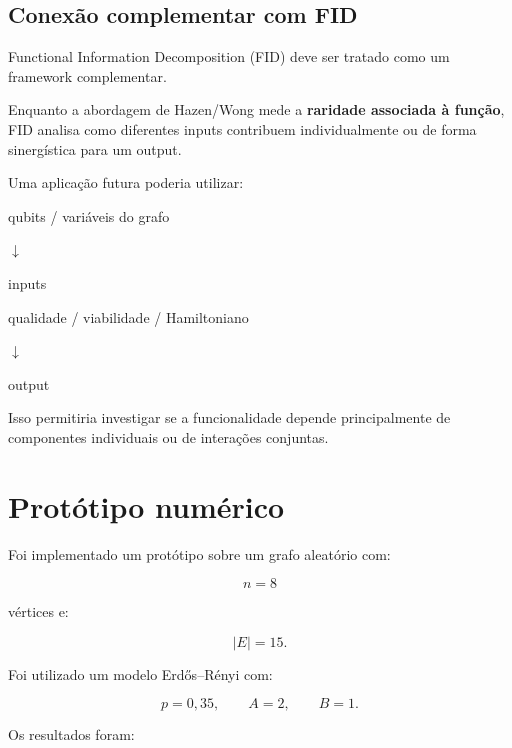 \documentclass[11pt,a4paper]{article}
\begin{document}
\subsection{Conexão complementar com FID}

Functional Information Decomposition (FID) deve ser tratado como
um framework complementar.

Enquanto a abordagem de Hazen/Wong mede a
\textbf{raridade associada à função},
FID analisa como diferentes inputs contribuem
individualmente ou de forma sinergística para um output.

Uma aplicação futura poderia utilizar:

\begin{center}

qubits / variáveis do grafo

$\downarrow$

inputs

\bigskip

qualidade / viabilidade / Hamiltoniano

$\downarrow$

output

\end{center}

Isso permitiria investigar se a funcionalidade depende principalmente
de componentes individuais ou de interações conjuntas.

\section{Protótipo numérico}

Foi implementado um protótipo sobre um grafo aleatório com:

\[
n=8
\]

vértices e:

\[
|E|=15.
\]

Foi utilizado um modelo Erd\H{o}s--R\'enyi com:

\[
p=0{,}35,
\qquad
A=2,
\qquad
B=1.
\]

Os resultados foram:
\end{document}
